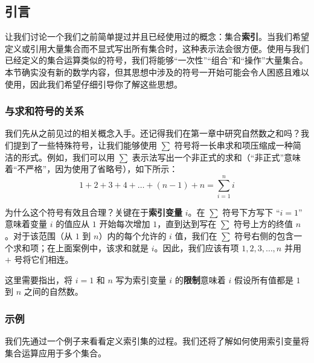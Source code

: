 \subsection{引言}

让我们讨论一个我们之前简单提过并且已经使用过的概念：集合\textbf{索引}。当我们希望定义或引用大量集合而不显式写出所有集合时，这种表示法会很方便。使用与我们已经定义的集合运算类似的符号，我们将能够``一次性''``组合''和``操作''大量集合。本节确实没有新的数学内容，但其思想中涉及的符号一开始可能会令人困惑且难以使用，因此我们希望仔细引导你了解这些思想。

\subsubsection*{与求和符号的关系}

我们先从之前见过的相关概念入手。还记得我们在第一章中研究自然数之和吗？我们提到了一些特殊符号，让我们能够使用 $\sum$ 符号将一长串求和项压缩成一种简洁的形式。例如，我们可以用 $\sum$ 表示法写出一个非正式的求和（``非正式''意味着``不严格''，因为使用了省略号），如下所示：
\[1 + 2 + 3 + 4 + \dots + (n - 1) + n = \sum_{i=1}^{n} i\]

为什么这个符号有效且合理？关键在于\textbf{索引变量} $i$。在 $\sum$ 符号下方写下 ``$i = 1$'' 意味着变量 $i$ 的值应从 $1$ 开始每次增加 $1$，直到达到写在 $\sum$ 符号上方的终值 $n$。对于该范围（从 $1$ 到 $n$）内的每个允许的 $i$ 值，我们在 $\sum$ 符号右侧的包含一个求和项；在上面案例中，该求和就是 $i$。因此，我们应该有项 $1, 2, 3,\dots, n$ 并用 $+$ 号将它们相连。

这里需要指出，将 $i = 1$ 和 $n$ 写为索引变量 $i$ 的\textbf{限制}意味着 $i$ 假设所有值都是 $1$ 到 $n$ 之间的自然数。

\subsubsection*{示例}

我们先通过一个例子来看看定义索引集的过程。我们还将了解如何使用索引变量将集合运算应用于多个集合。\\


